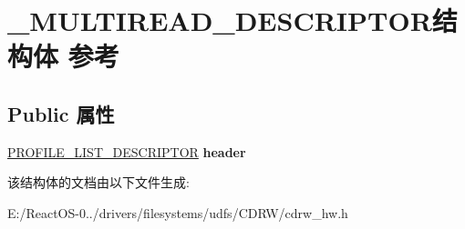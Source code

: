 \hypertarget{struct___m_u_l_t_i_r_e_a_d___d_e_s_c_r_i_p_t_o_r}{}\section{\+\_\+\+M\+U\+L\+T\+I\+R\+E\+A\+D\+\_\+\+D\+E\+S\+C\+R\+I\+P\+T\+O\+R结构体 参考}
\label{struct___m_u_l_t_i_r_e_a_d___d_e_s_c_r_i_p_t_o_r}
\subsection*{Public 属性}
\begin{DoxyCompactItemize}
\item 
\mbox{\label{struct___m_u_l_t_i_r_e_a_d___d_e_s_c_r_i_p_t_o_r_a910a69adbe23ff39df779cab08e7823f}} 
\hyperlink{struct___p_r_o_f_i_l_e___l_i_s_t___d_e_s_c_r_i_p_t_o_r}{P\+R\+O\+F\+I\+L\+E\+\_\+\+L\+I\+S\+T\+\_\+\+D\+E\+S\+C\+R\+I\+P\+T\+OR} {\bfseries header}
\end{DoxyCompactItemize}


该结构体的文档由以下文件生成\+:\begin{DoxyCompactItemize}
\item 
E\+:/\+React\+O\+S-\/0../drivers/filesystems/udfs/\+C\+D\+R\+W/cdrw\+\_\+hw.\+h\end{DoxyCompactItemize}
